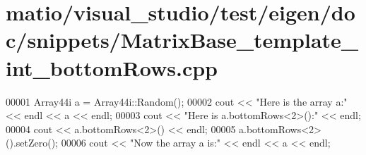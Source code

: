 \hypertarget{matio_2visual__studio_2test_2eigen_2doc_2snippets_2_matrix_base__template__int__bottom_rows_8cpp_source}{}\section{matio/visual\+\_\+studio/test/eigen/doc/snippets/\+Matrix\+Base\+\_\+template\+\_\+int\+\_\+bottom\+Rows.cpp}
\label{matio_2visual__studio_2test_2eigen_2doc_2snippets_2_matrix_base__template__int__bottom_rows_8cpp_source}

\begin{DoxyCode}
00001 Array44i a = Array44i::Random();
00002 cout << \textcolor{stringliteral}{"Here is the array a:"} << endl << a << endl;
00003 cout << \textcolor{stringliteral}{"Here is a.bottomRows<2>():"} << endl;
00004 cout << a.bottomRows<2>() << endl;
00005 a.bottomRows<2>().setZero();
00006 cout << \textcolor{stringliteral}{"Now the array a is:"} << endl << a << endl;
\end{DoxyCode}
